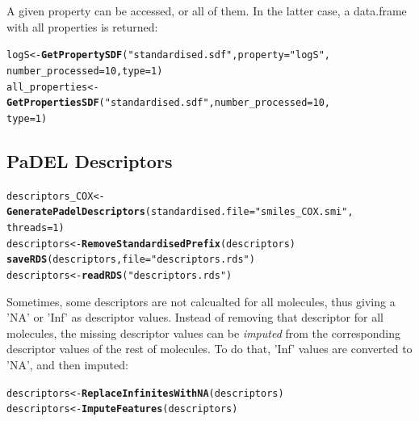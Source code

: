 \documentclass[twoside,a4wide,12pt]{article}\usepackage[]{graphicx}\usepackage[]{color}
\makeatletter
\newcommand{\hlnum}[1]{\textcolor[rgb]{0.686,0.059,0.569}{#1}}%
\newcommand{\hlstr}[1]{\textcolor[rgb]{0.192,0.494,0.8}{#1}}%
\newcommand{\hlstd}[1]{\textcolor[rgb]{0.345,0.345,0.345}{#1}}%
\newcommand{\hlkwb}[1]{\textcolor[rgb]{0.69,0.353,0.396}{#1}}%
\newcommand{\hlkwc}[1]{\textcolor[rgb]{0.333,0.667,0.333}{#1}}%
\newcommand{\hlkwd}[1]{\textcolor[rgb]{0.737,0.353,0.396}{\textbf{#1}}}%
\newenvironment{kframe}{%
 \def\at@end@of@kframe{}%
 \ifinner\ifhmode%
  \def\at@end@of@kframe{\end{minipage}}%
  \begin{minipage}{\columnwidth}%
 \fi\fi%
 \def\FrameCommand##1{\hskip\@totalleftmargin \hskip-\fboxsep
 \colorbox{shadecolor}{##1}\hskip-\fboxsep
     \hskip-\linewidth \hskip-\@totalleftmargin \hskip\columnwidth}%
 \MakeFramed {\advance\hsize-\width
   \@totalleftmargin\z@ \linewidth\hsize
   \@setminipage}}%
 {\par\unskip\endMakeFramed%
 \at@end@of@kframe}
\newenvironment{knitrout}{}{} %
\makeatother
\begin{document}
A given property can be accessed, or all of them. In the latter case, a data.frame with all properties is returned:
\begin{knitrout}
\color{fgcolor}\begin{kframe}
\begin{alltt}
\hlstd{logS} \hlkwb{<-} \hlkwd{GetPropertySDF}\hlstd{(}\hlstr{"standardised.sdf"}\hlstd{,} \hlkwc{property} \hlstd{=} \hlstr{"logS"}\hlstd{,}
    \hlkwc{number_processed} \hlstd{=} \hlnum{10}\hlstd{,} \hlkwc{type} \hlstd{=} \hlnum{1}\hlstd{)}
\hlstd{all_properties} \hlkwb{<-} \hlkwd{GetPropertiesSDF}\hlstd{(}\hlstr{"standardised.sdf"}\hlstd{,} \hlkwc{number_processed} \hlstd{=} \hlnum{10}\hlstd{,}
    \hlkwc{type} \hlstd{=} \hlnum{1}\hlstd{)}
\end{alltt}
\end{kframe}
\end{knitrout}


\subsection{PaDEL Descriptors}
\begin{knitrout}
\color{fgcolor}\begin{kframe}
\begin{alltt}
\hlstd{descriptors_COX} \hlkwb{<-} \hlkwd{GeneratePadelDescriptors}\hlstd{(}\hlkwc{standardised.file} \hlstd{=} \hlstr{"smiles_COX.smi"}\hlstd{,}
    \hlkwc{threads} \hlstd{=} \hlnum{1}\hlstd{)}
\hlstd{descriptors} \hlkwb{<-} \hlkwd{RemoveStandardisedPrefix}\hlstd{(descriptors)}
\hlkwd{saveRDS}\hlstd{(descriptors,} \hlkwc{file} \hlstd{=} \hlstr{"descriptors.rds"}\hlstd{)}
\hlstd{descriptors} \hlkwb{<-} \hlkwd{readRDS}\hlstd{(}\hlstr{"descriptors.rds"}\hlstd{)}
\end{alltt}
\end{kframe}
\end{knitrout}


Sometimes, some descriptors are not calcualted for all molecules, thus giving a 'NA' or 'Inf' as descriptor values. Instead of removing that descriptor for all molecules, the missing descriptor values can be {\it imputed} from the corresponding descriptor values of the rest of molecules. To do that, 'Inf' values are converted to 'NA', and then imputed:

\begin{knitrout}
\color{fgcolor}\begin{kframe}
\begin{alltt}
\hlstd{descriptors} \hlkwb{<-} \hlkwd{ReplaceInfinitesWithNA}\hlstd{(descriptors)}
\hlstd{descriptors} \hlkwb{<-} \hlkwd{ImputeFeatures}\hlstd{(descriptors)}
\end{alltt}
\end{kframe}
\end{knitrout}
\end{document}
